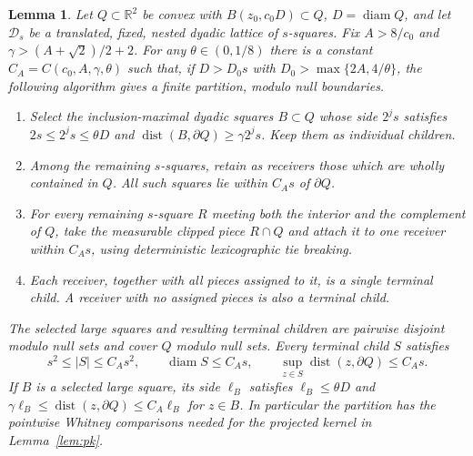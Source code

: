 \documentclass[11pt]{article}
\newtheorem{lemma}[lemma]{Lemma}
\theoremstyle{definition}
\theoremstyle{remark}
\numberwithin{equation}{section}
\newcommand{\dist}{\operatorname{dist}}
\newcommand{\diam}{\operatorname{diam}}
\begin{document}
\begin{lemma}
\label{lem:exactcover}
Let $Q\subset\mathbb R^2$ be convex with
$B(z_0,c_0D)\subset Q$, $D=\diam Q$, and let $\mathcal D_s$
be a translated, fixed, nested dyadic lattice of $s$-squares.
Fix $A>8/c_0$ and $\gamma>(A+\sqrt2)/2+2$.
For any $\theta\in(0,1/8)$ there is a constant
$C_A=C(c_0,A,\gamma,\theta)$ such that, if
$D>D_0s$ with $D_0>\max\{2A,4/\theta\}$, the following
algorithm gives a finite partition, modulo null boundaries.
\begin{enumerate}[label=(\roman*),leftmargin=2.5em]
\item Select the inclusion-maximal dyadic squares $B\subset Q$
whose side $2^js$ satisfies $2s\le 2^js\le\theta D$ and
$\dist(B,\partial Q)\ge\gamma 2^js$.  Keep them as individual
children.
\item Among the remaining $s$-squares, retain as \emph{receivers}
those which are wholly contained in $Q$.  All such squares
lie within $C_A s$ of $\partial Q$.
\item For every remaining $s$-square $R$ meeting both the interior
and the complement of $Q$, take the measurable clipped piece
$R\cap Q$ and attach it to one receiver within $C_A s$,
using deterministic lexicographic tie breaking.
\item Each receiver, together with all pieces assigned to it, is a
single terminal child.  A receiver with no assigned pieces is
also a terminal child.
\end{enumerate}
The selected large squares and resulting terminal children are
pairwise disjoint modulo null sets and cover $Q$ modulo null sets.
Every terminal child $S$ satisfies
\[
   s^2\le |S|\le C_A s^2,\qquad
   \diam S\le C_A s,\qquad
   \sup_{z\in S}\dist(z,\partial Q)\le C_A s.
\]
If $B$ is a selected large square, its side $\ell_B$ satisfies
$\ell_B\le\theta D$ and
$\gamma\ell_B\le\dist(z,\partial Q)\le C_A\ell_B$
for $z\in B$.  In particular the partition has the pointwise
Whitney comparisons needed for the projected kernel in
Lemma~\ref{lem:pk}.
\end{lemma}
\end{document}
